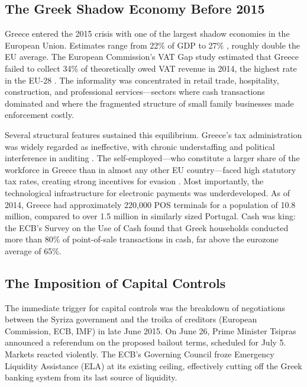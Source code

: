 \documentclass[12pt]{article}
\begin{document}
\subsection{The Greek Shadow Economy Before 2015}

Greece entered the 2015 crisis with one of the largest shadow economies in the European Union. Estimates range from 22\% of GDP \citep{medina2018shadow} to 27\% \citep{schneider2010new}, roughly double the EU average. The European Commission's VAT Gap study estimated that Greece failed to collect 34\% of theoretically owed VAT revenue in 2014, the highest rate in the EU-28 \citep{ecvat2019}. The informality was concentrated in retail trade, hospitality, construction, and professional services---sectors where cash transactions dominated and where the fragmented structure of small family businesses made enforcement costly.

Several structural features sustained this equilibrium. Greece's tax administration was widely regarded as ineffective, with chronic understaffing and political interference in auditing \citep{blanchard2013rethinking}. The self-employed---who constitute a larger share of the workforce in Greece than in almost any other EU country---faced high statutory tax rates, creating strong incentives for evasion \citep{slemrod2007cheating}. Most importantly, the technological infrastructure for electronic payments was underdeveloped. As of 2014, Greece had approximately 220,000 POS terminals for a population of 10.8 million, compared to over 1.5 million in similarly sized Portugal. Cash was king: the ECB's Survey on the Use of Cash found that Greek households conducted more than 80\% of point-of-sale transactions in cash, far above the eurozone average of 65\%.

\subsection{The Imposition of Capital Controls}

The immediate trigger for capital controls was the breakdown of negotiations between the Syriza government and the troika of creditors (European Commission, ECB, IMF) in late June 2015. On June 26, Prime Minister Tsipras announced a referendum on the proposed bailout terms, scheduled for July 5. Markets reacted violently. The ECB's Governing Council froze Emergency Liquidity Assistance (ELA) at its existing ceiling, effectively cutting off the Greek banking system from its last source of liquidity.
\end{document}
